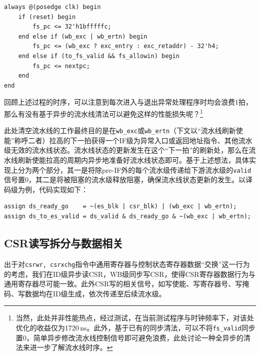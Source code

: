 \documentclass[UTF-8,twoside,cs4size]{ctexart}
\begin{document}
    \begin{verbatim}
always @(posedge clk) begin
    if (reset) begin
        fs_pc <= 32'h1bfffffc;
    end else if (wb_exc | wb_ertn) begin
        fs_pc <= (wb_exc ? exc_entry : exc_retaddr) - 32'h4;
    end else if (to_fs_valid && fs_allowin) begin
        fs_pc <= nextpc;
    end
end
    \end{verbatim}
    
    回顾上述过程的时序，可以注意到每次进入与退出异常处理程序时均会浪费1拍，那么有没有基于异步的流水线清法可以避免这样的性能损失呢？\footnote{当然，此处并非性能热点，经过测试，在当前测试程序与时钟频率下，对该处优化的收益仅为1720\,ns。此外，基于已有的同步清法，可以不将\texttt{fs\_valid}同步置0，简单异步修改流水线控制信号即可避免浪费，此处讨论一种全异步的清法来进一步了解流水线时序。}
    
    此处清空流水线的工作最终目的是在\texttt{wb\_exc}或\texttt{wb\_ertn}（下文以“流水线刷新使能”称呼二者）拉高的下一拍获得一个IF级为异常入口或返回地址指令、其他流水级无效的流水线状态。流水线状态的更新发生在这个“下一拍”的刷新处，那么在流水线刷新使能拉高的周期内异步地准备好流水线状态即可。基于上述想法，具体实现上分为两个部分，其一是将除pre-IF外的每个流水级传递给下游流水级的\texttt{valid}信号置0，其二是将被阻塞的流水级释放阻塞，确保流水线状态更新的发生。以译码级为例，代码实现如下：
    
    \begin{verbatim}
assign ds_ready_go    = ~(es_blk | csr_blk) | (wb_exc | wb_ertn);
assign ds_to_es_valid = ds_valid & ds_ready_go & ~(wb_exc | wb_ertn);
    \end{verbatim}
    
    \subsection{\textbf{CSR}读写拆分与数据相关}
    
    出于对\texttt{csrwr, csrxchg}指令中通用寄存器与控制状态寄存器数据“交换”这一行为的考虑，我们在ID级异步读CSR，WB级同步写CSR，使得CSR寄存器数据行为与通用寄存器尽可能一致。此外CSR写的相关信号，如写使能、写寄存器号、写掩码、写数据均在ID级生成，依次传递至后续流水级。
    
\end{document}
